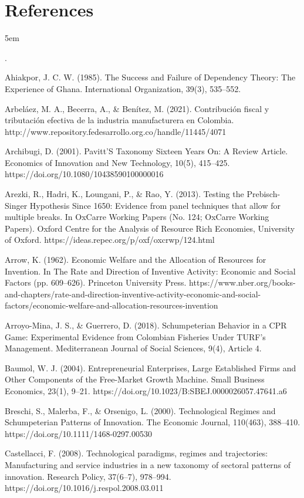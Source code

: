 \documentclass[12pt,a4paper]{article}
\begin{document}
\section*{References}
\emergencystretch 5em
\raggedright
{\setlength{\parindent}{-1.7em}
	\-\footnotesize.
	\normalsize

Ahiakpor, J. C. W. (1985). The Success and Failure of Dependency Theory: The Experience of Ghana. International Organization, 39(3), 535–552.

Arbeláez, M. A., Becerra, A., \& Benítez, M. (2021). Contribución fiscal y tributación efectiva de la industria manufacturera en Colombia. http://www.repository.fedesarrollo.org.co/handle/11445/4071

Archibugi, D. (2001). Pavitt’S Taxonomy Sixteen Years On: A Review Article. Economics of Innovation and New Technology, 10(5), 415–425. https://doi.org/10.1080/10438590100000016

Arezki, R., Hadri, K., Loungani, P., \& Rao, Y. (2013). Testing the Prebisch-Singer Hypothesis Since 1650: Evidence from panel techniques that allow for multiple breaks. In OxCarre Working Papers (No. 124; OxCarre Working Papers). Oxford Centre for the Analysis of Resource Rich Economies, University of Oxford. https://ideas.repec.org/p/oxf/oxcrwp/124.html

Arrow, K. (1962). Economic Welfare and the Allocation of Resources for Invention. In The Rate and Direction of Inventive Activity: Economic and Social Factors (pp. 609–626). Princeton University Press. https://www.nber.org/books-and-chapters/rate-and-direction-inventive-activity-economic-and-social-factors/economic-welfare-and-allocation-resources-invention

Arroyo-Mina, J. S., \& Guerrero, D. (2018). Schumpeterian Behavior in a CPR Game: Experimental Evidence from Colombian Fisheries Under TURF’s Management. Mediterranean Journal of Social Sciences, 9(4), Article 4.

Baumol, W. J. (2004). Entrepreneurial Enterprises, Large Established Firms and Other Components of the Free-Market Growth Machine. Small Business Economics, 23(1), 9–21. https://doi.org/10.1023/B:SBEJ.0000026057.47641.a6

Breschi, S., Malerba, F., \& Orsenigo, L. (2000). Technological Regimes and Schumpeterian Patterns of Innovation. The Economic Journal, 110(463), 388–410. https://doi.org/10.1111/1468-0297.00530

Castellacci, F. (2008). Technological paradigms, regimes and trajectories: Manufacturing and service industries in a new taxonomy of sectoral patterns of innovation. Research Policy, 37(6–7), 978–994. https://doi.org/10.1016/j.respol.2008.03.011

}
\end{document}
